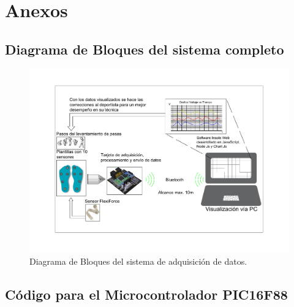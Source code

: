 \chapter{Anexos}\label{sec:Anexos}

\section{Diagrama de Bloques del sistema completo}

\begin{figure}[h!]
\centering
\includegraphics[width=1\textwidth]{./Documentos_PDF/Diagrama_de_Bloques_sistema_Insole.pdf}
\caption{Diagrama de Bloques del sistema de adquisición de datos.}
\label{fig:DiagramaBloque}
\end{figure}

\newpage
\section{Código para el Microcontrolador PIC16F88}

